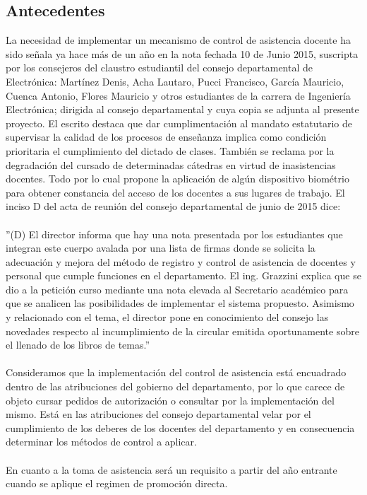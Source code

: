 \documentclass[a4paper, 11pt]{article} %
\begin{document}
\subsection*{Antecedentes}
La necesidad de implementar un mecanismo de control de asistencia docente ha sido señala ya hace más de un año en la nota fechada 10 de Junio 2015, suscripta por los consejeros del claustro estudiantil del consejo departamental de Electrónica: Martínez Denis, Acha Lautaro, Pucci Francisco, García Mauricio, Cuenca Antonio, Flores Mauricio y otros estudiantes de la carrera de Ingeniería Electrónica; dirigida al consejo departamental y cuya copia se adjunta al presente proyecto. El escrito destaca que dar cumplimentación al mandato estatutario de supervisar la calidad de los procesos de enseñanza implica como condición prioritaria el cumplimiento del dictado de clases. También se reclama por  la degradación del cursado de determinadas cátedras en virtud de inasistencias docentes. Todo por lo cual propone la aplicación de algún dispositivo biométrio para obtener constancia del acceso de los docentes a sus lugares de trabajo.
El inciso D del acta de reunión del consejo departamental de junio de 2015 dice:\\
\\
''(D) El director informa que hay una nota presentada por los estudiantes que integran este cuerpo avalada por una lista de firmas donde se solicita la adecuación y mejora del método de registro y control de asistencia de docentes y personal que cumple funciones en el departamento. El ing. Grazzini explica que se dio a la petición curso mediante una nota elevada al Secretario académico para que se analicen las posibilidades de implementar el sistema propuesto. Asimismo y relacionado con el tema, el director pone en conocimiento del consejo las novedades respecto al incumplimiento de la circular emitida oportunamente sobre el llenado de los libros de temas.''\\
\\
Consideramos que la implementación del control de asistencia está encuadrado dentro de las atribuciones del gobierno del departamento, por lo que carece de objeto cursar pedidos de autorización o consultar por la implementación del mismo. Está en las atribuciones del consejo departamental velar por el cumplimiento de los deberes de los docentes del departamento y en consecuencia determinar los métodos de control a aplicar.\\
\\
En cuanto a la toma de asistencia será un requisito a partir del año entrante cuando se aplique el regimen de promoción directa.
\end{document}
